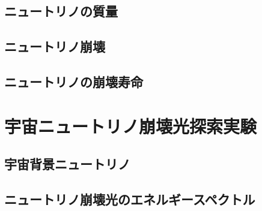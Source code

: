 \subsection{ニュートリノの質量}																%
\subsection{ニュートリノ崩壊}																	%
\subsection{ニュートリノの崩壊寿命}															%
\section{宇宙ニュートリノ崩壊光探索実験}														%
\subsection{宇宙背景ニュートリノ}																%
\subsection{ニュートリノ崩壊光のエネルギースペクトル}												%
